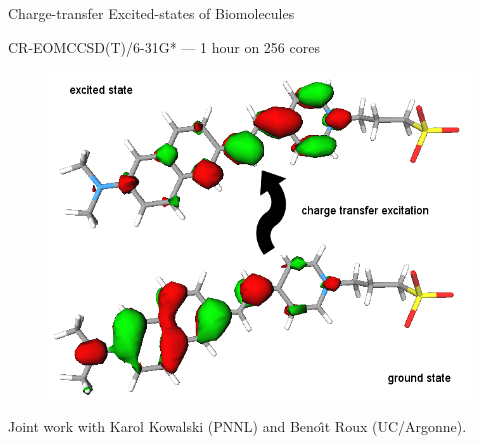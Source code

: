 \documentclass[11pt]{beamer}
\begin{document}
  \begin{frame}{Charge-transfer Excited-states of Biomolecules} \Large
    \begin{normalsize}
        CR-EOMCCSD(T)/6-31G* --- 1 hour on 256 cores
    \end{normalsize}
    \begin{figure}
        \includegraphics[scale=0.3,angle=0]{ANEPPS_scf_6-31pGs_orbitals-105-106.png}
    \end{figure}
    \begin{center}\begin{tiny}
        Joint work with Karol Kowalski (PNNL) and Beno\^{\i}t Roux (UC/Argonne).
    \end{tiny}\end{center}
  \end{frame}
\end{document}
